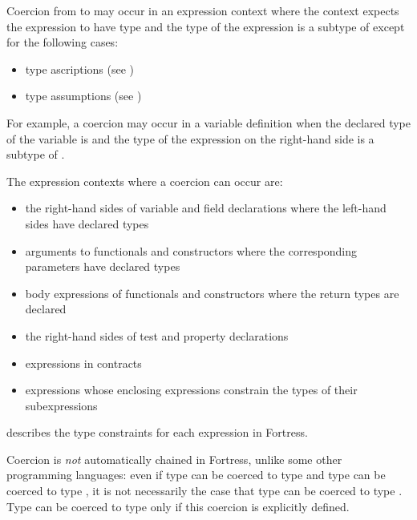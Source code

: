 Coercion from  to  may occur in an expression context
where the context expects the expression to have type  and
the type of the expression is a subtype of  except for the following
cases:
\begin{itemize}
\item type ascriptions (see )
\item type assumptions (see )
\end{itemize}
For example, a coercion may occur in a variable definition when the
declared type of the variable is  and the type of the expression on
the right-hand side is a subtype of .


The expression contexts where a coercion can occur are:
\begin{itemize}
\item the right-hand sides of variable and field declarations where the
  left-hand sides have declared types
\item arguments to functionals and constructors where the corresponding
  parameters have declared types
\item body expressions of functionals and constructors where the return
  types are declared
\item the right-hand sides of test and property declarations
\item expressions in contracts
\item expressions whose enclosing expressions constrain the types of
  their subexpressions
\end{itemize}
 describes the type constraints for each expression in
Fortress.


Coercion is \emph{not} automatically chained in Fortress, unlike some
other programming languages: even if type  can be coerced to
type  and type  can be coerced to type , it is
not necessarily the case that type  can be coerced to type
.  Type  can be coerced to type  only if this
coercion is explicitly defined.

